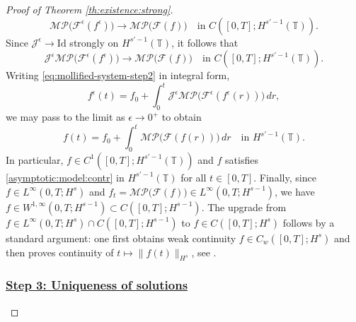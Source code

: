 \documentclass[reqno]{amsart}
\newcommand{\TT}{\mathbb T}
\newcommand{\Id}{\mathrm{Id}}
\theoremstyle{definition}
\numberwithin{equation}{section}
\numberwithin{theorem}{section}
\numberwithin{definition}{section}
\begin{document}
\begin{proof}[Proof of Theorem \ref{th:existence:strong}]
\[
\mathcal{M}\mathcal{P}\big(\mathcal{F}^\epsilon(f^\epsilon)\big)\to \mathcal{M}\mathcal{P}\big(\mathcal{F}(f)\big)
\quad\text{in } C([0,T];H^{s'-1}(\TT)).
\]
Since $\mathcal{J}^\epsilon\to \Id$ strongly on $H^{s'-1}(\TT)$, it follows that
\[
\mathcal{J}^\epsilon\mathcal{M}\mathcal{P}\big(\mathcal{F}^\epsilon(f^\epsilon)\big)\to
\mathcal{M}\mathcal{P}\big(\mathcal{F}(f)\big)
\quad\text{in } C([0,T];H^{s'-1}(\TT)).
\]
Writing \eqref{eq:mollified-system-step2} in integral form,
\[
f^\epsilon(t)=f_0+\int_0^t \mathcal{J}^\epsilon\mathcal{M}\mathcal{P}\big(\mathcal{F}^\epsilon(f^\epsilon(r))\big)\,dr,
\]
we may pass to the limit as $\epsilon\to 0^+$ to obtain
\[
f(t)=f_0+\int_0^t \mathcal{M}\mathcal{P}\big(\mathcal{F}(f(r))\big)\,dr
\quad\text{in } H^{s'-1}(\TT).
\]
In particular, $f\in C^1([0,T];H^{s'-1}(\TT))$ and $f$ satisfies \eqref{asymptotic:model:contr} in $H^{s'-1}(\TT)$
for all $t\in[0,T]$.
Finally, since $f\in L^\infty(0,T;H^s)$ and $f_t=\mathcal{M}\mathcal{P}\big(\mathcal{F}(f)\big)\in L^\infty(0,T;H^{s-1})$,
we have $f\in W^{1,\infty}(0,T;H^{s-1})\subset C([0,T];H^{s-1})$. The upgrade from
$f\in L^\infty(0,T;H^s)\cap C([0,T];H^{s-1})$ to $f\in C([0,T];H^s)$ follows by a standard argument:
one first obtains weak continuity $f\in C_w([0,T];H^s)$ and then proves continuity of $t\mapsto \|f(t)\|_{H^s}$, see \cite{MajdaBertozzi2002}.

\subsubsection*{\underline{Step 3: Uniqueness of solutions}}


\end{proof}
\end{document}
